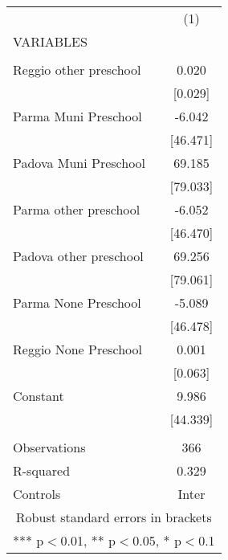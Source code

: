 \begin{tabular}{lc} \hline
 & (1) \\
VARIABLES &  \\ \hline
 &  \\
Reggio other preschool & 0.020 \\
 & [0.029] \\
Parma Muni Preschool & -6.042 \\
 & [46.471] \\
Padova Muni Preschool & 69.185 \\
 & [79.033] \\
Parma other preschool & -6.052 \\
 & [46.470] \\
Padova other preschool & 69.256 \\
 & [79.061] \\
Parma None Preschool & -5.089 \\
 & [46.478] \\
Reggio None Preschool & 0.001 \\
 & [0.063] \\
Constant & 9.986 \\
 & [44.339] \\
 &  \\
Observations & 366 \\
R-squared & 0.329 \\
 Controls & Inter \\ \hline
\multicolumn{2}{c}{ Robust standard errors in brackets} \\
\multicolumn{2}{c}{ *** p$<$0.01, ** p$<$0.05, * p$<$0.1} \\
\end{tabular}
